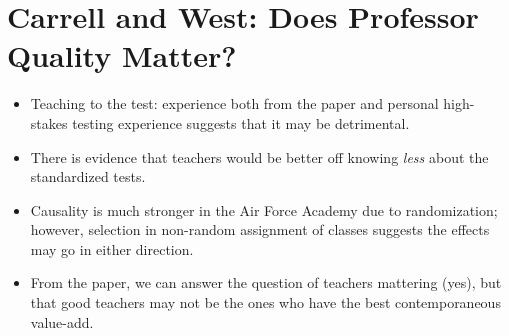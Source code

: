 \documentclass[10pt]{extarticle}
\begin{document}
  \section{Carrell and West: Does Professor Quality Matter?}%
  \begin{itemize}
    \item Teaching to the test: experience both from the paper and personal high-stakes testing experience suggests that it may be detrimental.
    \item There is evidence that teachers would be better off knowing \textit{less} about the standardized tests.
    \item Causality is much stronger in the Air Force Academy due to randomization; however, selection in non-random assignment of classes suggests the effects may go in either direction.
    \item From the paper, we can answer the question of teachers mattering (yes), but that good teachers may not be the ones who have the best contemporaneous value-add.
  \end{itemize}
\end{document}
